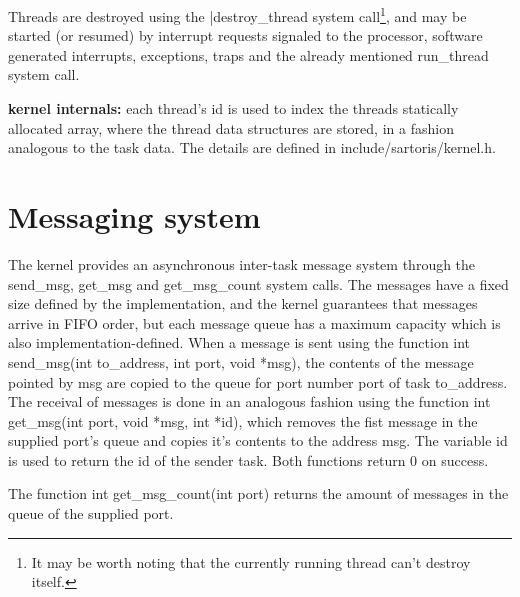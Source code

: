 \documentclass[11pt, letterpaper, twoside, english]{book}
\begin{document}
Threads are destroyed using the \textsf{|destroy\_thread} system call\footnote{It may be worth noting that the currently running thread can't destroy itself.}, and may be started (or resumed) by interrupt requests signaled to the processor, software generated interrupts, exceptions, traps and the already mentioned \textsf{run\_thread} system call.

\textbf{kernel internals:} each thread's \textsf{id} is used to index the \textsf{threads} statically allocated array, where the \textsf{thread} data structures are stored, in a fashion analogous to the task data. The details are defined in \textsf{include/sartoris/kernel.h}.

\section{Messaging system}
The kernel provides an asynchronous inter-task message system through the \textsf{send\_msg}, \textsf{get\_msg} and \textsf{get\_msg\_count} system calls. The messages have a fixed size defined by the implementation, and the kernel guarantees that messages arrive in FIFO order, but each message queue has a maximum capacity which is also implementation-defined. When a message is sent using the function \textsf{int send\_msg(int to\_address, int port, void *msg)}, the contents of the message pointed by \textsf{msg} are copied to the queue for port number \textsf{port} of task \textsf{to\_address}. The receival of messages is done in an analogous fashion using the function \textsf{int get\_msg(int port, void *msg, int *id)}, which removes the fist message in the supplied \textsf{port}'s queue and copies it's contents to the address \textsf{msg}. The variable \textsf{id} is used to return the id of the sender task. Both functions return 0 on success. 

The function \textsf{int get\_msg\_count(int port)} returns the amount of messages in the queue of the supplied port.
\end{document}
